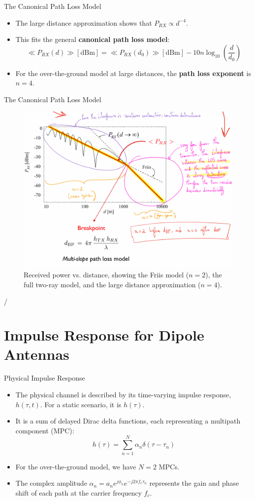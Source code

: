 \documentclass{beamer}
\begin{document}
	\begin{frame}{The Canonical Path Loss Model}
		\begin{itemize}
			\item The large distance approximation shows that $P_{RX} \propto d^{-4}$.
			\item This fits the general \textbf{canonical path loss model}:
			\[ \ll P_{RX}(d)\gg[\text{dBm}] = \ll P_{RX}(d_{0})\gg[\text{dBm}] - 10n \log_{10}\left(\frac{d}{d_0}\right) \]
			\item For the over-the-ground model at large distances, the \textbf{path loss exponent} is $n=4$.
		\end{itemize}
	\end{frame}
	
	\begin{frame}{The Canonical Path Loss Model}
		\begin{figure}
			\centering
			\includegraphics[width=0.65\linewidth]{"pictures/pathloss-plot.png"}
			\caption{Received power vs. distance, showing the Friis model ($n=2$), the full two-ray model, and the large distance approximation ($n=4$).}
		\end{figure}
/	\end{frame}
	
	\section{Impulse Response for Dipole Antennas}
	
	\begin{frame}{Physical Impulse Response}
		\begin{itemize}
			\item The physical channel is described by its time-varying impulse response, $h(\tau, t)$. For a static scenario, it is $h(\tau)$.
			\item It is a sum of delayed Dirac delta functions, each representing a multipath component (MPC):
			\[ h(\tau) = \sum_{n=1}^{N} \alpha_n \delta(\tau - \tau_n) \]
			\item For the over-the-ground model, we have $N=2$ MPCs.
			\item The complex amplitude $\alpha_n = a_n e^{j\phi_n}e^{-j2\pi f_c \tau_n}$ represents the gain and phase shift of each path at the carrier frequency $f_c$.
		\end{itemize}
	\end{frame}
	
\end{document}
